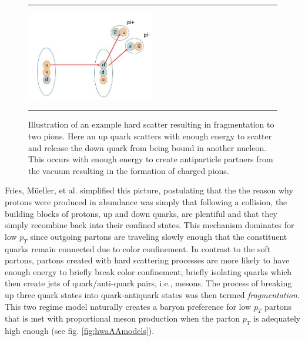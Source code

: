\begin{figure}[htbp!]
  \centering    \rule{35em}{0.5pt}
    \includegraphics[width=0.5\textwidth]{Figures/fragmentationdiag.JPG}

  \caption[Illustration of an example hard scatter resulting in fragmentation to two pions]{Illustration of an example hard scatter resulting in fragmentation to two pions. Here an up quark scatters with enough energy to scatter and release the down quark from being bound in another nucleon. This occurs with enough energy to create antiparticle partners from the vacuum resulting in the formation of charged pions.}
  \label{fig:fragmentationdiag}    \rule{35em}{0.5pt}
\end{figure} 
Fries, M{\"u}eller, et al. simplified this picture, postulating that the the reason why protons were produced in abundance was simply that following a collision, the building blocks of protons, up and down quarks, are plentiful and that they simply recombine back into their confined states. This mechanism dominates for low $p_{T}$ since outgoing partons are traveling slowly enough that the constituent quarks remain connected due to color confinement. In contrast to the soft partons, partons created with hard scattering processes are more likely to have enough energy to briefly break color confinement, briefly isolating quarks which then create jets of quark/anti-quark pairs, i.e., mesons. The process of breaking up three quark states into quark-antiquark states was then termed \textit{fragmentation}. This two regime model naturally creates a baryon preference for low $p_{T}$ partons that is met with proportional meson production when the parton $p_{T}$ is adequately high enough (see fig. \ref{fig:hwaAAmodels}).


